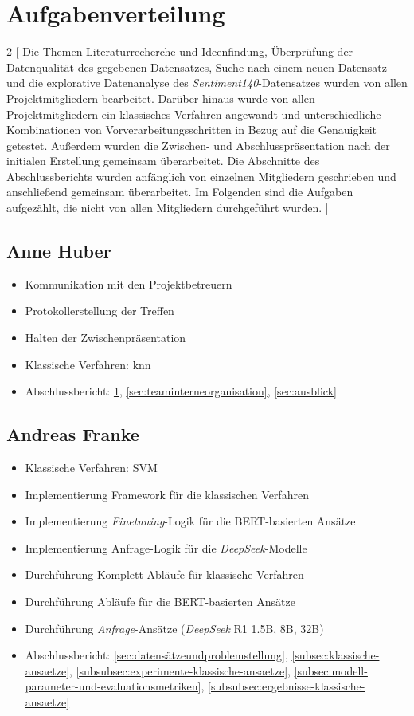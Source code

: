 \section{Aufgabenverteilung}\label{sec:aufgabenverteilung}

\begin{multicols}{2}
[
Die Themen Literaturrecherche und Ideenfindung, Überprüfung der Datenqualität des gegebenen Datensatzes, Suche nach einem neuen Datensatz und die explorative Datenanalyse des \textit{Sentiment140}-Datensatzes wurden von allen Projektmitgliedern bearbeitet.
Darüber hinaus wurde von allen Projektmitgliedern ein klassisches Verfahren angewandt und unterschiedliche Kombinationen von Vorverarbeitungsschritten in Bezug auf die Genauigkeit getestet.
Außerdem wurden die Zwischen- und Abschlusspräsentation nach der initialen Erstellung gemeinsam überarbeitet.
Die Abschnitte des Abschlussberichts wurden anfänglich von einzelnen Mitgliedern geschrieben und anschließend gemeinsam überarbeitet.
Im Folgenden sind die Aufgaben aufgezählt, die nicht von allen Mitgliedern durchgeführt wurden.
]

\subsection{Anne Huber}
\begin{itemize}
    \item Kommunikation mit den Projektbetreuern
    \item Protokollerstellung der Treffen
    \item Halten der Zwischenpräsentation
    \item Klassische Verfahren: \gls{knn}
    \item Abschlussbericht: \ref{sec:aufgabenverteilung}, \ref{sec:teaminterneorganisation}, \ref{sec:ausblick}
\end{itemize}


\subsection{Andreas Franke}
\begin{itemize}
    \item Klassische Verfahren: SVM
    \item Implementierung Framework für die klassischen Verfahren
    \item Implementierung \textit{Finetuning}-Logik für die BERT-basierten Ansätze
    \item Implementierung Anfrage-Logik für die \textit{DeepSeek}-Modelle
    \item Durchführung Komplett-Abläufe für klassische Verfahren
    \item Durchführung Abläufe für die BERT-basierten Ansätze
    \item Durchführung \textit{Anfrage}-Ansätze (\textit{DeepSeek} R1 1.5B, 8B, 32B)
    \item Abschlussbericht: \ref{sec:datensätzeundproblemstellung}, \ref{subsec:klassische-ansaetze}, \ref{subsubsec:experimente-klassische-ansaetze}, \ref{subsec:modell-parameter-und-evaluationsmetriken}, \ref{subsubsec:ergebnisse-klassische-ansaetze}
\end{itemize}


\end{multicols}
